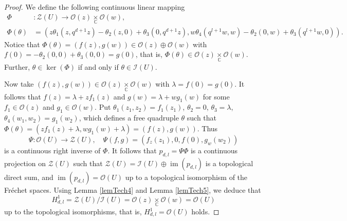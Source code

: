 \documentclass[12pt,reqno]{amsart}%
\theoremstyle{plain}
\numberwithin{theorem}{section} \numberwithin{equation}{section}
\numberwithin{lemma}{section}
\numberwithin{remark}{section}
\numberwithin{example}{section}
\numberwithin{proposition}{section}
\numberwithin{definition}{section}
\numberwithin{corollary}{section}
\begin{document}
\begin{proof}
We define the following continuous linear mapping
\begin{align*}
\Phi &  :\mathcal{Z}\left(  U\right)  \longrightarrow\mathcal{O}\left(
z\right)  \underset{\mathbb{C}}{\times}\mathcal{O}\left(  w\right)  ,\\
\Phi\left(  \theta\right)   &  =\left(  z\theta_{1}\left(  z,q^{d+1}z\right)
-\theta_{2}\left(  z,0\right)  +\theta_{3}\left(  0,q^{d+1}z\right)
,w\theta_{4}\left(  q^{l+1}w,w\right)  -\theta_{2}\left(  0,w\right)
+\theta_{3}\left(  q^{l+1}w,0\right)  \right)  .
\end{align*}
Notice that $\Phi\left(  \theta\right)  =\left(  f\left(  z\right)  ,g\left(
w\right)  \right)  \in\mathcal{O}\left(  z\right)  \oplus\mathcal{O}\left(
w\right)  $ with $f\left(  0\right)  =-\theta_{2}\left(  0,0\right)
+\theta_{3}\left(  0,0\right)  =g\left(  0\right)  $, that is, $\Phi\left(
\theta\right)  \in\mathcal{O}\left(  z\right)  \underset{\mathbb{C}}{\times
}\mathcal{O}\left(  w\right)  $. Further, $\theta\in\ker\left(  \Phi\right)  $
if and only if $\theta\in\mathcal{I}\left(  U\right)  $.

Now take $\left(  f\left(  z\right)  ,g\left(  w\right)  \right)
\in\mathcal{O}\left(  z\right)  \underset{\mathbb{C}}{\times}\mathcal{O}%
\left(  w\right)  $ with $\lambda=f\left(  0\right)  =g\left(  0\right)  $. It
follows that $f\left(  z\right)  =\lambda+zf_{1}\left(  z\right)  $ and
$g\left(  w\right)  =\lambda+wg_{1}\left(  w\right)  $ for some $f_{1}%
\in\mathcal{O}\left(  z\right)  $ and $g_{1}\in\mathcal{O}\left(  w\right)  $.
Put $\theta_{1}\left(  z_{1},z_{2}\right)  =f_{1}\left(  z_{1}\right)  $,
$\theta_{2}=0$, $\theta_{3}=\lambda$, $\theta_{4}\left(  w_{1},w_{2}\right)
=g_{1}\left(  w_{2}\right)  $, which defines a free quadruple $\theta$ such
that $\Phi\left(  \theta\right)  =\left(  zf_{1}\left(  z\right)
+\lambda,wg_{1}\left(  w\right)  +\lambda\right)  =\left(  f\left(  z\right)
,g\left(  w\right)  \right)  $. Thus
\[
\Psi:\mathcal{O}\left(  U\right)  \longrightarrow\mathcal{Z}\left(  U\right)
,\quad\Psi\left(  f,g\right)  =\left(  f_{z}\left(  z_{1}\right)  ,0,f\left(
0\right)  ,g_{w}\left(  w_{2}\right)  \right)
\]
is a continuous right inverse of $\Phi$. It follows that $p_{d,l}=\Psi\Phi$ is
a continuous projection on $\mathcal{Z}\left(  U\right)  $ such that
$\mathcal{Z}\left(  U\right)  =\mathcal{I}\left(  U\right)  \oplus
\operatorname{im}\left(  p_{d,l}\right)  $ is a topological direct sum, and
$\operatorname{im}\left(  p_{d,l}\right)  =\mathcal{O}\left(  U\right)  $ up
to a topological isomorphism of the Fr\'{e}chet spaces. Using Lemma
\ref{lemTech4} and Lemma \ref{lemTech5}, we deduce that
\[
H_{d,l}^{1}=\mathcal{Z}\left(  U\right)  /\mathcal{I}\left(  U\right)
=\mathcal{O}\left(  z\right)  \underset{\mathbb{C}}{\times}\mathcal{O}\left(
w\right)  =\mathcal{O}\left(  U\right)
\]
up to the topological isomorphisms, that is, $H_{d,l}^{1}=\mathcal{O}\left(
U\right)  $ holds.
\end{proof}
\end{document}
